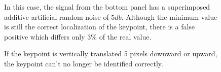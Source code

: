 \begin{figure}[h!]
\centering
{}
\caption[Patch localization on a noisy signal]{In this case, the signal from the bottom panel has a superimposed additive artificial random noise of $5 \si{db}$.  Although the minimum value is still the correct localization of the keypoint, there is a false positive which differs only $3\%$ of the real value. }
\label{fig:dialdescriptors1}
\end{figure}


\begin{figure}[h!]
\centering
{}
\caption[Patch localization on a vertical translated keypoint]{If the keypoint is vertically translated 5 pixels downward or upward, the keypoint can't no longer be identified correctly.}
\label{fig:dialdescriptors1}
\end{figure}


